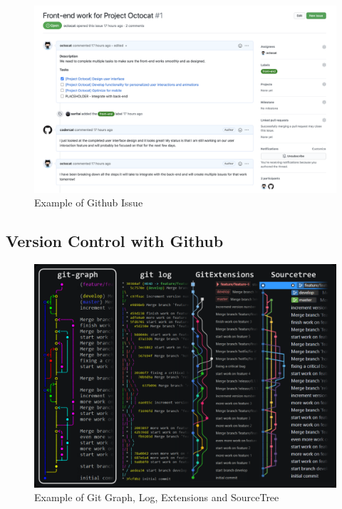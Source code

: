 \documentclass[12pt,a4paper]{article}
\begin{document}
\begin{spacing}{1.5}
    \begin{figure}[h]
        \centering
        \includegraphics[width=16cm]{assets/github-issue-example.png}
        \caption{Example of Github Issue}
        \label{fig:github-issue-example}%
    \end{figure}
    \FloatBarrier

    \subsection{Version Control with Github}\label{subseq:version-control}

    \begin{figure}[H]
        \centering
        \includegraphics[width=16cm]{assets/git-graph-example.png}
        \caption{Example of Git Graph, Log, Extensions and SourceTree}%
        \label{fig:git-graph}%
    \end{figure}
    \FloatBarrier


\end{spacing}
\end{document}
